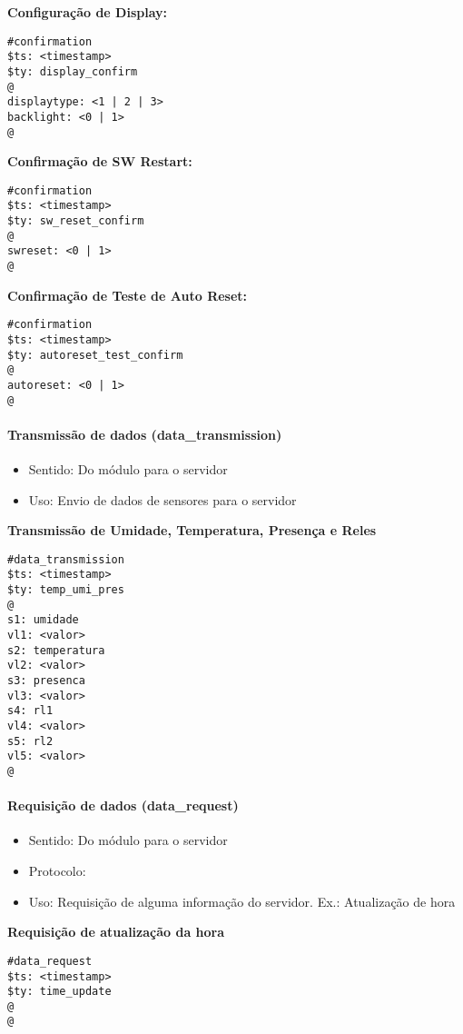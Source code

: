 \textbf{Configuração de Display:}
\begin{lstlisting}
#confirmation
$ts: <timestamp>
$ty: display_confirm
@
displaytype: <1 | 2 | 3>
backlight: <0 | 1>
@
\end{lstlisting}

\textbf{Confirmação de SW Restart:}
\begin{lstlisting}
#confirmation
$ts: <timestamp>
$ty: sw_reset_confirm
@
swreset: <0 | 1>
@
\end{lstlisting}

\textbf{Confirmação de Teste de Auto Reset:}
\begin{lstlisting}
#confirmation
$ts: <timestamp>
$ty: autoreset_test_confirm
@
autoreset: <0 | 1>
@
\end{lstlisting}

\paragraph{Transmissão de dados (data\_transmission)}
\begin{itemize}
\item Sentido: Do módulo para o servidor
\item Uso: Envio de dados de sensores para o servidor
\end{itemize}

\textbf{Transmissão de Umidade, Temperatura, Presença e Reles}
\begin{lstlisting}
#data_transmission
$ts: <timestamp>
$ty: temp_umi_pres
@
s1: umidade
vl1: <valor>
s2: temperatura
vl2: <valor>
s3: presenca
vl3: <valor>
s4: rl1
vl4: <valor>
s5: rl2
vl5: <valor>
@
\end{lstlisting}

\paragraph{Requisição de dados (data\_request)}
\begin{itemize}
\item Sentido: Do módulo para o servidor
\item Protocolo: \wmqtt
\item Uso: Requisição de alguma informação do servidor. Ex.: Atualização de hora
\end{itemize}

\textbf{Requisição de atualização da hora}
\begin{lstlisting}
#data_request
$ts: <timestamp>
$ty: time_update
@
@
\end{lstlisting}

